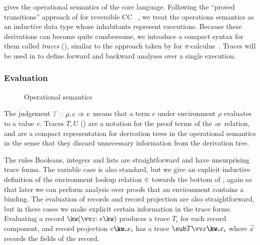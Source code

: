  gives the operational semantics of the core language. Following the ``proved transitions'' approach of \citeauthor{boudol89} for reversible CC~ \cite{boudol89}, we treat the operations semantics as an inductive data type whose inhabitants represent executions. Because these derivations can become quite cumbersome, we introduce a compact syntax for them called \emph{traces} (), similar to the approach taken by \citeauthor{perera16d} for $\pi$-calculus~\cite{perera16d}. Traces will be used in  to define forward and backward analyses over a single execution.

\subsubsection{Evaluation}
\label{sec:core-language:eval}

\begin{figure}
   
   
   
   \caption{Operational semantics}
   \label{fig:core-language:semantics}
\end{figure}



The judgement $\explVal{T}{\rho, e \evalR v}$ means that a term $e$ under environment $\rho$ evaluates to a value $v$. Traces $T, U$ () are a notation for the proof terms of the $\Rightarrow$ relation, and are a compact representation for derivation trees in the operational semantics in the sense that they discard unnecessary information from the derivation tree.

The rules Booleans, integers and lists are straightforward and have unsurprising trace forms. The variable case is also standard, but we give an explicit inductive definition of the environment lookup relation $\in$ towards the bottom of , again so that later we can perform analysis over proofs that an environment contains a binding. The evaluation of records and record projection are also straightforward, but in these cases we make explicit certain information in the trace forms. Evaluating a record $\exRec{\vec{\bind{x}{e}}}$ produces a trace $T_i$ for each record component, and record projection $\exRecProj{e}{x_i}$ has a trace $\trRecProj{T}{\vec{x}}{x_i}$ where $\vec{x}$ records the fields of the record.

